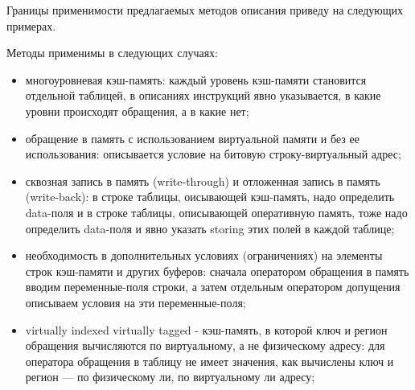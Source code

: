 Границы применимости предлагаемых методов описания приведу на следующих
примерах.

Методы применимы в следующих случаях:
\begin{itemize}
    \item многоуровневая кэш-память: каждый уровень кэш-памяти становится
отдельной таблицей, в описаниях инструкций явно указывается, в какие уровни
происходят обращения, а в какие нет;
    \item обращение в память с использованием виртуальной памяти и без ее
использования: описывается условие на битовую строку-виртуальный адрес;
    \item сквозная запись в память (write-through) и отложенная запись в память
(write-back): в строке таблицы, оисывающей кэш-память, надо определить data-поля
и в строке таблицы, описывающей оперативную память, тоже надо определить
data-поля и явно указать storing этих полей в каждой таблице;
    \item необходимость в дополнительных условиях (ограничениях) на элементы
строк кэш-памяти и других буферов: сначала оператором обращения в память вводим
переменные-поля строки, а затем отдельным оператором допущения описываем условия
на эти переменные-поля;
    \item virtually indexed virtually tagged - кэш-память, в которой ключ и
регион обращения вычисляются по виртуальному, а не физическому адресу: для
оператора обращения в таблицу не имеет значения, как вычислены ключ и регион ---
по физическому ли, по виртуальному ли адресу;
\end{itemize}


